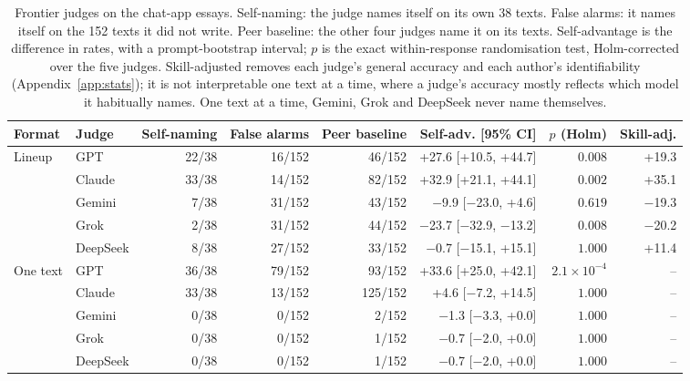 \begin{table}[t]
\centering\small\setlength\tabcolsep{3.5pt}
\begin{adjustbox}{max width=\linewidth}
\begin{tabular}{llrrrrrr}
\toprule
Format & Judge & Self-naming & False alarms & Peer baseline & Self-adv. [95\% CI] & $p$ (Holm) & Skill-adj. \\
\midrule
Lineup & GPT & 22/38 & 16/152 & 46/152 & +27.6 [+10.5, +44.7] & $0.008$ & +19.3 \\
 & Claude & 33/38 & 14/152 & 82/152 & +32.9 [+21.1, +44.1] & $0.002$ & +35.1 \\
 & Gemini & 7/38 & 31/152 & 43/152 & $-$9.9 [$-$23.0, +4.6] & $0.619$ & $-$19.3 \\
 & Grok & 2/38 & 31/152 & 44/152 & $-$23.7 [$-$32.9, $-$13.2] & $0.008$ & $-$20.2 \\
 & DeepSeek & 8/38 & 27/152 & 33/152 & $-$0.7 [$-$15.1, +15.1] & $1.000$ & +11.4 \\
\midrule
One text & GPT & 36/38 & 79/152 & 93/152 & +33.6 [+25.0, +42.1] & $2.1\times10^{-4}$ & -- \\
 & Claude & 33/38 & 13/152 & 125/152 & +4.6 [$-$7.2, +14.5] & $1.000$ & -- \\
 & Gemini & 0/38 & 0/152 & 2/152 & $-$1.3 [$-$3.3, +0.0] & $1.000$ & -- \\
 & Grok & 0/38 & 0/152 & 1/152 & $-$0.7 [$-$2.0, +0.0] & $1.000$ & -- \\
 & DeepSeek & 0/38 & 0/152 & 1/152 & $-$0.7 [$-$2.0, +0.0] & $1.000$ & -- \\
\bottomrule
\end{tabular}
\end{adjustbox}
\caption{Frontier judges on the chat-app essays. Self-naming: the judge names itself on its own 38 texts. False alarms: it names itself on the 152 texts it did not write. Peer baseline: the other four judges name it on its texts. Self-advantage is the difference in rates, with a prompt-bootstrap interval; $p$ is the exact within-response randomisation test, Holm-corrected over the five judges. Skill-adjusted removes each judge's general accuracy and each author's identifiability (Appendix~\ref{app:stats}); it is not interpretable one text at a time, where a judge's accuracy mostly reflects which model it habitually names. One text at a time, Gemini, Grok and DeepSeek never name themselves.}
\label{tab:frontier}
\end{table}
